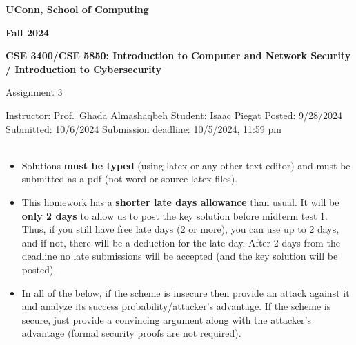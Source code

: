 \documentclass[12pt]{article}
\newcommand{\handout}[2]{
\renewcommand{\thepage}{\footnotesize CSE 3400/CSE 5850, #1, p. \arabic{page}}
\begin{center}

\noindent
{\bf UConn, School of Computing}

\noindent
{\bf Fall 2024}

\noindent
{\bf CSE 3400/CSE 5850: Introduction to Computer and Network Security \\ / Introduction to Cybersecurity}
\end{center}

\begin{center}
{\Large #1}
\end{center}
}
\begin{document}
\handout{Assignment 3}{}

\noindent
{Instructor: Prof.~Ghada Almashaqbeh}
\newline
{Student: Isaac Piegat}
\newline
\noindent
{Posted: 9/28/2024}
\newline
{Submitted: 10/6/2024}
\noindent
\newline
{Submission deadline: 10/5/2024, 11:59 pm} \\\\

\begin{itemize}
\item Solutions {\bf must be typed} (using latex or any other text editor) and must be submitted as a pdf (not word or source latex files).

\item This homework has a \textbf{shorter late days allowance} than usual. It will be \textbf{only 2 days} to allow us to post the key solution before midterm test 1. Thus, if you still have free late days (2 or more), you can use up to 2 days, and if not, there will be a deduction for the late day. After 2 days from the deadline no late submissions will be accepted (and the key solution will be posted).

\item In all of the below, if the scheme is insecure then provide an attack against it and analyze its success probability/attacker's advantage. If the scheme is secure, just provide a convincing argument along with the attacker's advantage (formal security proofs are not required).
\\
\end{itemize}
\end{document}
